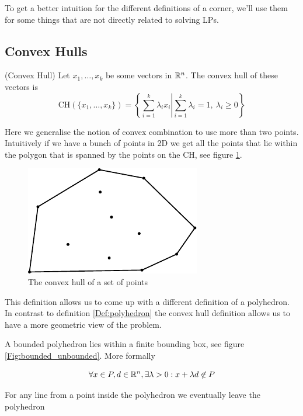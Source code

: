 To get a better intuition for the different definitions of a corner, we'll use them for some things that are not directly related to solving LPs.

\subsection{Convex Hulls}

\begin{Def}(Convex Hull) Let $x_1,\ldots,x_k$ be some vectors in $\mathbb{R}^n$. The convex hull of these vectors is
\[\mbox{CH}(\{x_1,\ldots,x_k\}) = \left\{\sum _{i=1}^k \lambda_i x_i \left| \sum_{i=1}^k \lambda_i =1,\ \lambda_i\geq 0\right.\right\}\]
\end{Def}

Here we generalise the notion of convex combination to use more than two points. Intuitively if we have a bunch of points in 2D we get all the points that lie within the polygon that is spanned by the points on the CH, see figure \ref{Fig:convexHull}.

\begin{figure}[hbt]
\begin{center}
\includegraphics{./images/convex_hull.pdf}
\end{center}
\caption{The convex hull of a set of points}
\label{Fig:convexHull}
\end{figure}

This definition allows us to come up with a different definition of a polyhedron. In contrast to definition \ref{Def:polyhedron} the convex hull definition allows us to have a more geometric view of the problem.

\begin{Def} A bounded polyhedron lies within a finite bounding box, see figure \ref{Fig:bounded_unbounded}. More formally

\[\forall x\in P,d\in \mathbb{R}^n, \exists \lambda > 0: x+\lambda d \not \in P\]

For any line from a point inside the polyhedron we eventually leave the polyhedron
\end{Def}

